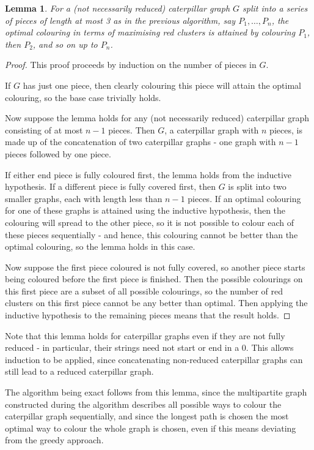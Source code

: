 \documentclass{mpaper}
\newtheorem{lemma}{Lemma}[section]
\begin{document}
\begin{lemma}
\label{lem/sequential-optimal}
For a (not necessarily reduced) caterpillar graph $G$ split into a series of pieces of length at most 3 as in the previous algorithm, say $P_1, \dots, P_n$, the optimal colouring in terms of maximising red clusters is attained by colouring $P_1$, then $P_2$, and so on up to $P_n$.
\end{lemma}
\begin{proof}
This proof proceeds by induction on the number of pieces in $G$.

 If $G$ has just one piece, then clearly colouring this piece will attain the optimal colouring, so the base case trivially holds.

 Now suppose the lemma holds for any (not necessarily reduced) caterpillar graph consisting of at most $n-1$ pieces. Then $G$, a caterpillar graph with $n$ pieces, is made up of the concatenation of two caterpillar graphs - one graph with $n-1$ pieces followed by one piece.

If either end piece is fully coloured first, the lemma holds from the inductive hypothesis. If a different piece is fully covered first, then $G$ is split into two smaller graphs, each with length less than $n-1$ pieces. If an optimal colouring for one of these graphs is attained using the inductive hypothesis, then the colouring will spread to the other piece, so it is not possible to colour each of these pieces sequentially - and hence, this colouring cannot be better than the optimal colouring, so the lemma holds in this case.

Now suppose the first piece coloured is not fully covered, so another piece starts being coloured before the first piece is finished. Then the possible colourings on this first piece are a subset of all possible colourings, so the number of red clusters on this first piece cannot be any better than optimal. Then applying the inductive hypothesis to the remaining pieces means that the result holds.

\end{proof}

Note that this lemma holds for caterpillar graphs even if they are not fully reduced - in particular, their strings need not start or end in a $0$. This allows induction to be applied, since concatenating non-reduced caterpillar graphs can still lead to a reduced caterpillar graph.

The algorithm being exact follows from this lemma, since the multipartite graph constructed during the algorithm describes all possible ways to colour the caterpillar graph sequentially, and since the longest path is chosen the most optimal way to colour the whole graph is chosen, even if this means deviating from the greedy approach.
\end{document}
